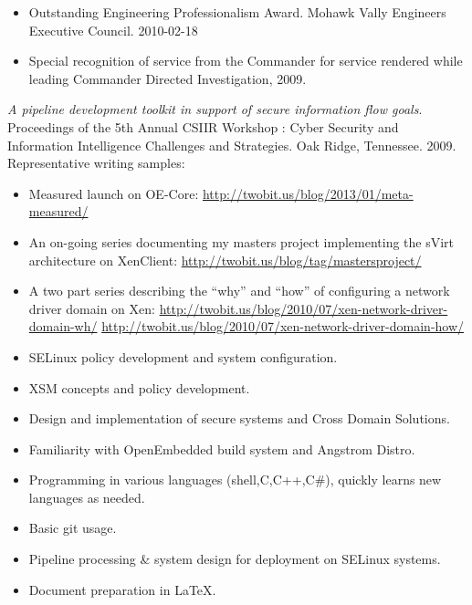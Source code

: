 \documentclass[letterpaper,11pt]{article}
\begin{document}
    \begin {itemize}
      \setlength {\itemsep}{1pt}
      \setlength {\parskip}{0pt}
      \setlength {\parsep}{0pt}
    \item Outstanding Engineering Professionalism Award.
      Mohawk Vally Engineers Executive Council.
      2010-02-18
    \item Special recognition of service from the Commander for service rendered while leading Commander Directed Investigation, 2009.
    \end {itemize}

    {\it A pipeline development toolkit in support of secure information flow goals}.
    Proceedings of the 5th Annual CSIIR Workshop : Cyber Security and Information Intelligence Challenges and Strategies.
    Oak Ridge, Tennessee.
    2009.\\
    Representative writing samples:
    \begin {itemize}
      \setlength {\itemsep}{1pt}
      \setlength {\parskip}{0pt}
      \setlength {\parsep}{0pt}
    \item
      Measured launch on OE-Core:
      \url {http://twobit.us/blog/2013/01/meta-measured/}
    \item
      An on-going series documenting my masters project implementing the sVirt architecture on XenClient:
      \url {http://twobit.us/blog/tag/mastersproject/}
    \item
      A two part series describing the ``why'' and ``how'' of configuring a network driver domain on Xen:
      \url {http://twobit.us/blog/2010/07/xen-network-driver-domain-wh/}
      \url {http://twobit.us/blog/2010/07/xen-network-driver-domain-how/}
    \end {itemize}
    \begin {itemize}
      \setlength {\itemsep}{1pt}
      \setlength {\parskip}{0pt}
      \setlength {\parsep}{0pt}
      \item SELinux policy development and system configuration.
      \item XSM concepts and policy development.
      \item Design and implementation of secure systems and Cross Domain Solutions.
      \item Familiarity with OpenEmbedded build system and Angstrom Distro.
      \item Programming in various languages (shell,C,C++,C\#), quickly learns new languages as needed.
      \item Basic git usage.
      \item Pipeline processing \& system design for deployment on SELinux systems.
      \item Document preparation in \LaTeX.
    \end {itemize}
\end{document}
